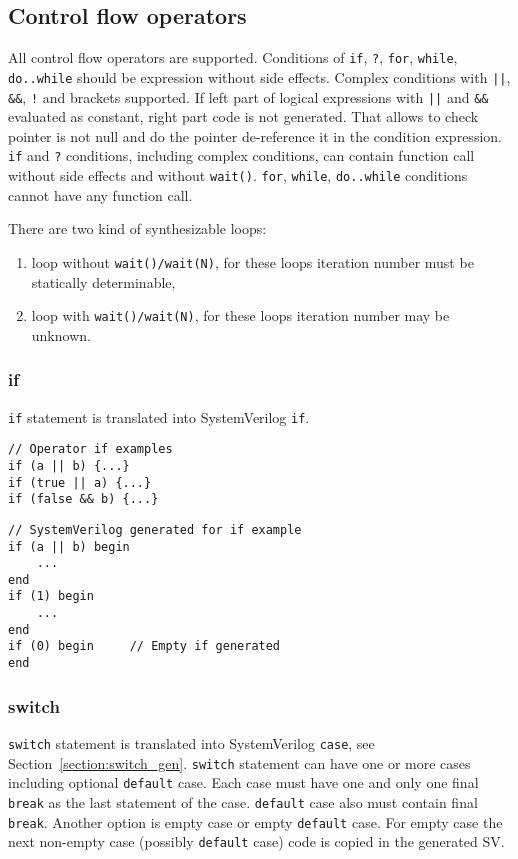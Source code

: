 \subsection{Control flow operators}

All control flow operators are supported. 
Conditions of {\tt if}, {\tt ?}, {\tt for}, {\tt while}, {\tt do..while} should be expression without side effects. Complex conditions with {\tt ||}, {\tt \&\&}, {\tt !} and brackets supported. If left part of logical expressions with {\tt ||} and {\tt \&\&} evaluated as constant, right part code is not generated. 
%
That allows to check pointer is not null and do the pointer de-reference it in the condition expression. {\tt if} and {\tt ?} conditions, including complex conditions, can contain function call without side effects and without {\tt wait()}. {\tt for}, {\tt while}, {\tt do..while} conditions cannot have any function call.

There are two kind of synthesizable loops:
\begin{enumerate}
\item loop without {\tt wait()/wait(N)}, for these loops iteration number must be statically determinable,
\item loop with {\tt wait()/wait(N)}, for these loops iteration number may be unknown.
\end{enumerate}


\subsubsection{if}

{\tt if} statement is translated into SystemVerilog {\tt if}. 

\begin{lstlisting}[style=mycpp]
// Operator if examples
if (a || b) {...}
if (true || a) {...}
if (false && b) {...}
\end{lstlisting}
%
\begin{lstlisting}[style=myverilog]
// SystemVerilog generated for if example
if (a || b) begin 
    ... 
end
if (1) begin 
    ... 
end
if (0) begin     // Empty if generated
end
\end{lstlisting}

\subsubsection{switch}

{\tt switch} statement is translated into SystemVerilog {\tt case}, see Section~\ref{section:switch_gen}.
{\tt switch} statement can have one or more cases including optional {\tt default} case. Each case must have one and only one final {\tt break} as the last statement of the case. {\tt default} case also must contain final {\tt break}. Another option is empty case or empty {\tt default} case. For empty case the next non-empty case (possibly {\tt default} case) code is copied in the generated SV.

